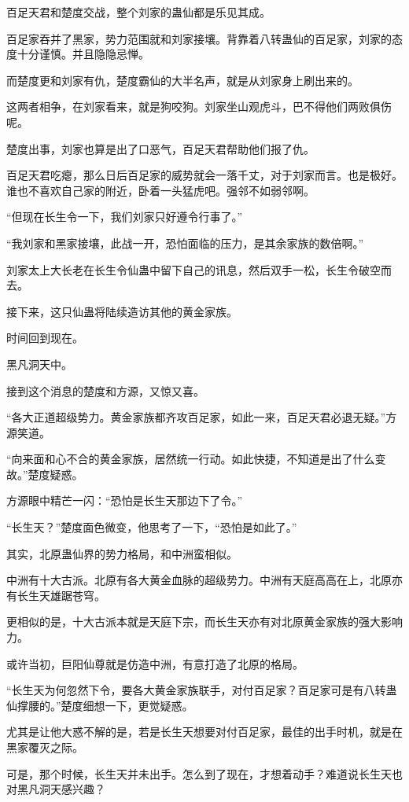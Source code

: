 \begin{this_body}
百足天君和楚度交战，整个刘家的蛊仙都是乐见其成。

百足家吞并了黑家，势力范围就和刘家接壤。背靠着八转蛊仙的百足家，刘家的态度十分谨慎。并且隐隐忌惮。

而楚度更和刘家有仇，楚度霸仙的大半名声，就是从刘家身上刷出来的。

这两者相争，在刘家看来，就是狗咬狗。刘家坐山观虎斗，巴不得他们两败俱伤呢。

楚度出事，刘家也算是出了口恶气，百足天君帮助他们报了仇。

百足天君吃瘪，那么日后百足家的威势就会一落千丈，对于刘家而言。也是极好。谁也不喜欢自己家的附近，卧着一头猛虎吧。强邻不如弱邻啊。

“但现在长生令一下，我们刘家只好遵令行事了。”

“我刘家和黑家接壤，此战一开，恐怕面临的压力，是其余家族的数倍啊。”

刘家太上大长老在长生令仙蛊中留下自己的讯息，然后双手一松，长生令破空而去。

接下来，这只仙蛊将陆续造访其他的黄金家族。

时间回到现在。

黑凡洞天中。

接到这个消息的楚度和方源，又惊又喜。

“各大正道超级势力。黄金家族都齐攻百足家，如此一来，百足天君必退无疑。”方源笑道。

“向来面和心不合的黄金家族，居然统一行动。如此快捷，不知道是出了什么变故。”楚度疑惑。

方源眼中精芒一闪：“恐怕是长生天那边下了令。”

“长生天？”楚度面色微变，他思考了一下，“恐怕是如此了。”

其实，北原蛊仙界的势力格局，和中洲蛮相似。

中洲有十大古派。北原有各大黄金血脉的超级势力。中洲有天庭高高在上，北原亦有长生天雄踞苍穹。

更相似的是，十大古派本就是天庭下宗，而长生天亦有对北原黄金家族的强大影响力。

或许当初，巨阳仙尊就是仿造中洲，有意打造了北原的格局。

“长生天为何忽然下令，要各大黄金家族联手，对付百足家？百足家可是有八转蛊仙撑腰的。”楚度细想一下，更觉疑惑。

尤其是让他大惑不解的是，若是长生天想要对付百足家，最佳的出手时机，就是在黑家覆灭之际。

可是，那个时候，长生天并未出手。怎么到了现在，才想着动手？难道说长生天也对黑凡洞天感兴趣？


\end{this_body}

